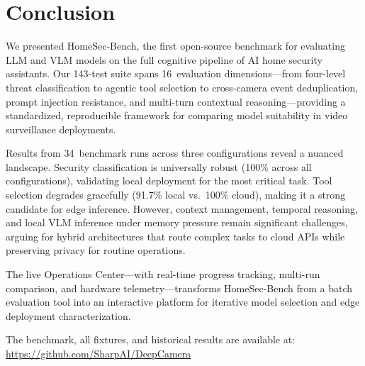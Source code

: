 \documentclass[conference]{IEEEtran}
\begin{document}
\section{Conclusion}

We presented HomeSec-Bench, the first open-source benchmark for evaluating
LLM and VLM models on the full cognitive pipeline of AI home security
assistants. Our 143-test suite spans 16~evaluation dimensions---from
four-level threat classification to agentic tool selection to cross-camera
event deduplication, prompt injection resistance, and multi-turn contextual
reasoning---providing a standardized, reproducible framework for
comparing model suitability in video surveillance deployments.

Results from 34~benchmark runs across three configurations reveal a
nuanced landscape. Security classification is universally robust (100\%
across all configurations), validating local deployment for the most
critical task. Tool selection degrades gracefully (91.7\% local vs.\
100\% cloud), making it a strong candidate for edge inference. However,
context management, temporal reasoning, and local VLM inference under
memory pressure remain significant challenges, arguing for hybrid
architectures that route complex tasks to cloud APIs while preserving
privacy for routine operations.

The live Operations Center---with real-time progress tracking,
multi-run comparison, and hardware telemetry---transforms
HomeSec-Bench from a batch evaluation tool into an interactive
platform for iterative model selection and edge deployment
characterization.

The benchmark, all fixtures, and historical results are available at:
\url{https://github.com/SharpAI/DeepCamera}

\balance

\end{document}
